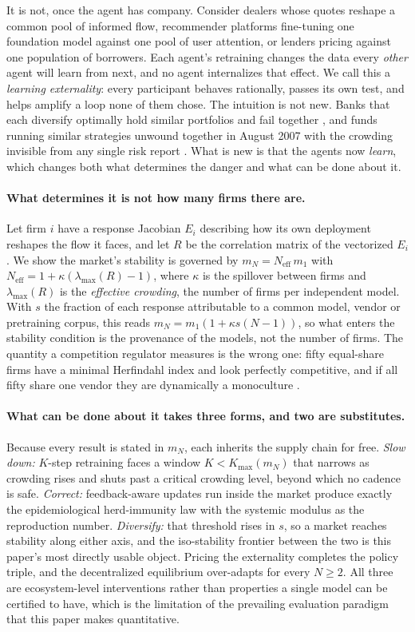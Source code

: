 \documentclass{article}
\theoremstyle{plain}
\theoremstyle{definition}
\newcommand{\Neff}{N_{\mathrm{eff}}}
\newcommand{\mN}{m_N}
\newcommand{\lmax}{\lambda_{\max}}
\begin{document}
It is not, once the agent has company. Consider dealers whose quotes reshape a common pool of informed flow, recommender platforms fine-tuning one foundation model against one pool of user attention, or lenders pricing against one population of borrowers. Each agent's retraining changes the data every \emph{other} agent will learn from next, and no agent internalizes that effect. We call this a \emph{learning externality}: every participant behaves rationally, passes its own test, and helps amplify a loop none of them chose. The intuition is not new. Banks that each diversify optimally hold similar portfolios and fail together \citep{beale2011,wagner2010}, and funds running similar strategies unwound together in August 2007 with the crowding invisible from any single risk report \citep{khandani2007}. What is new is that the agents now \emph{learn}, which changes both what determines the danger and what can be done about it.

\paragraph{What determines it is not how many firms there are.}
Let firm $i$ have a response Jacobian $E_i$ describing how its own deployment reshapes the flow it faces, and let $R$ be the correlation matrix of the vectorized $E_i$. We show the market's stability is governed by $\mN = \Neff\, m_1$ with $\Neff = 1 + \kappa(\lmax(R)-1)$, where $\kappa$ is the spillover between firms and $\lmax(R)$ is the \emph{effective crowding}, the number of firms per independent model. With $s$ the fraction of each response attributable to a common model, vendor or pretraining corpus, this reads $\mN = m_1(1 + \kappa s (N-1))$, so what enters the stability condition is the provenance of the models, not the number of firms. The quantity a competition regulator measures is the wrong one: fifty equal-share firms have a minimal Herfindahl index and look perfectly competitive, and if all fifty share one vendor they are dynamically a monoculture \citep{hirschman1964}.

\paragraph{What can be done about it takes three forms, and two are substitutes.}
Because every result is stated in $\mN$, each inherits the supply chain for free. \emph{Slow down:} $K$-step retraining faces a window $K < K_{\max}(\mN)$ that narrows as crowding rises and shuts past a critical crowding level, beyond which no cadence is safe. \emph{Correct:} feedback-aware updates \citep{izzo2021} run inside the market produce exactly the epidemiological herd-immunity law with the systemic modulus as the reproduction number. \emph{Diversify:} that threshold rises in $s$, so a market reaches stability along either axis, and the iso-stability frontier between the two is this paper's most directly usable object. Pricing the externality completes the policy triple, and the decentralized equilibrium over-adapts for every $N \geq 2$. All three are ecosystem-level interventions rather than properties a single model can be certified to have, which is the limitation of the prevailing evaluation paradigm that this paper makes quantitative.
\end{document}
